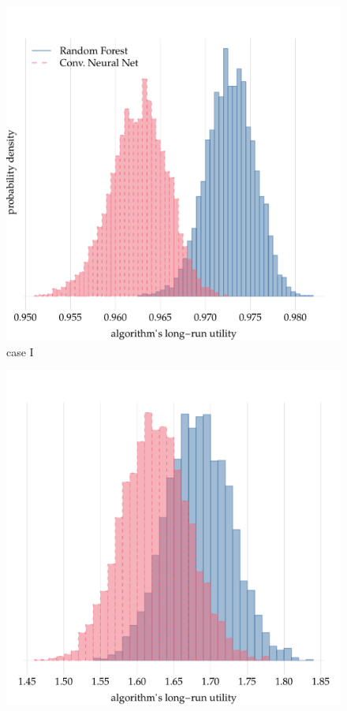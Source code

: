 \documentclass[\ifafour a4paper,12pt,\else a5paper,10pt,\fi%
onecolumn,oneside,article,%
british%
]{memoir}
\theoremstyle{remark}
\theoremstyle{innote}
\renewcommand*{\|}[1][]{\nonscript\:#1\vert\nonscript\:\mathopen{}}
\begin{document}
\begin{figure}[!p]
  \centering
  \parbox{0.495\linewidth}{\centering
    \includegraphics[width=\linewidth]{histogram_alg_utilities_1.pdf}
   \\ case I}%
  \hfill
  \parbox{0.495\linewidth}{\centering
    \includegraphics[width=\linewidth]{histogram_alg_utilities_2.pdf}
}
\end{figure}
\end{document}
